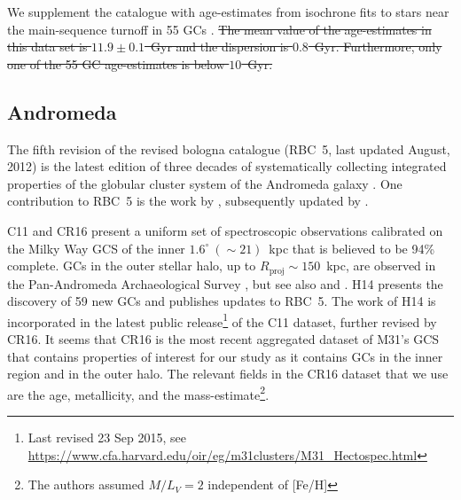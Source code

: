 \documentclass[a4paper,fleqn,usenatbib]{mnras}
\providecommand{\DIFdel}[1]{{\protect\color{red}\sout{#1}}}                      %
\providecommand{\DIFaddbegin}{} %
\providecommand{\DIFaddend}{} %
\providecommand{\DIFdelbegin}{} %
\providecommand{\DIFdelend}{} %
\begin{document}

\DIFdelend We supplement the catalogue
with age-estimates from isochrone fits to stars near the main-sequence turnoff 
in 55 GCs \citep[][hereafter V13]{2013ApJ...775..134V}.
\DIFdelbegin \DIFdel{The mean value of the age-estimates in this data set is $11.9 \pm 0.1$~Gyr and
the dispersion is $0.8$~Gyr. Furthermore, only one of the 55 GC age-estimates is
below $10$~Gyr.
}\DIFdelend \DIFaddbegin 

\DIFaddend 

\subsection{Andromeda}
\label{sec:andromeda}
The fifth revision of the revised bologna catalogue (RBC~5, last updated
August, 2012) is the latest edition of three decades of systematically
collecting integrated properties of the globular cluster system of the
Andromeda galaxy \citep[][and references therein]{2004A&A...416..917G}. One
contribution to RBC~5 is the work by \citet[][hereafter C11]{2011AJ....141...61C},
subsequently updated by \citet[][hereafter CR16]{2016ApJ...824...42C}.

C11 and CR16 present a uniform set of spectroscopic observations calibrated
on the Milky Way GCS of the inner $1.6^\circ~({\sim}21)$~kpc that
is believed to be 94\% complete. GCs in the outer stellar halo, up to
$R_{\text{proj}}\sim150$~kpc, are observed in the Pan-Andromeda Archaeological
Survey \citep[PAndAS, ][hereafter H14]{2014MNRAS.442.2165H}, but see also
\citet{2014MNRAS.442.2929V} and \citet{2019MNRAS.484.1756M}. H14 presents the
discovery of 59 new GCs and publishes updates to RBC~5. The work of H14 is
incorporated in the latest public release\footnote{Last revised 23 Sep 2015, see
\url{https://www.cfa.harvard.edu/oir/eg/m31clusters/M31_Hectospec.html}}
of the C11 dataset, further revised by CR16. It seems that CR16 is the most
recent aggregated dataset of M31's GCS that contains properties of interest
for our study as it contains GCs in the inner region and in the outer halo. The
relevant fields in the CR16 dataset that we use are the age, metallicity, and the
mass-estimate\footnote{The authors assumed $M/L_V = 2$ independent of [Fe/H]}.
\end{document}
